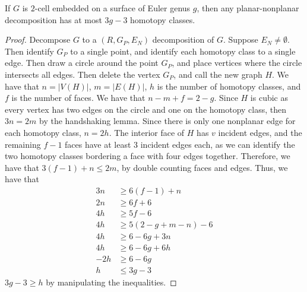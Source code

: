 \begin{lemma}
	If \(G\) is \(2\)-cell embedded on a surface of Euler genus \(g\), then any planar-nonplanar decomposition has at most \(3g-3\) homotopy classes. 
\end{lemma}
\begin{proof}
	Decompose \(G\) to a \((R, G_P, E_N)\) decomposition of \(G\). Suppose \(E_N \neq \emptyset\). Then identify \(G_P\) to a single point, and identify each homotopy class to a single edge. Then draw a circle around the point \(G_P\), and place vertices where the circle intersects all edges. Then delete the vertex \(G_P\), and call the new graph \(H\). We have that \(n = |V(H)|\), \(m = |E(H)|\), \(h\) is the number of homotopy classes, and \(f\) is the number of faces. We have that \(n - m + f = 2 - g\). Since \(H\) is cubic as every vertex has two edges on the circle and one on the homotopy class, then \(3n = 2m\) by the handshaking lemma. Since there is only one nonplanar edge for each homotopy class, \(n = 2h\). The interior face of \(H\) has \(v\) incident edges, and the remaining \(f-1\) faces have at least 3 incident edges each, as we can identify the two homotopy classes bordering a face with four edges together. Therefore, we have that \(3(f-1) + n \leq 2m\), by double counting faces and edges. Thus, we have that
	\begin{align*}
		3n &\geq 6(f - 1) + n\\
		2n &\geq 6f + 6\\
		4h &\geq 5 f - 6\\
		4h &\geq 5(2 - g + m - n) - 6\\
		4h &\geq 6 - 6g + 3n\\
		4h &\geq 6 - 6g + 6h\\
		-2h &\geq 6 - 6g\\
		h &\leq 3g - 3
	\end{align*}
	\(3g - 3 \geq h\) by manipulating the inequalities. 
\end{proof}

